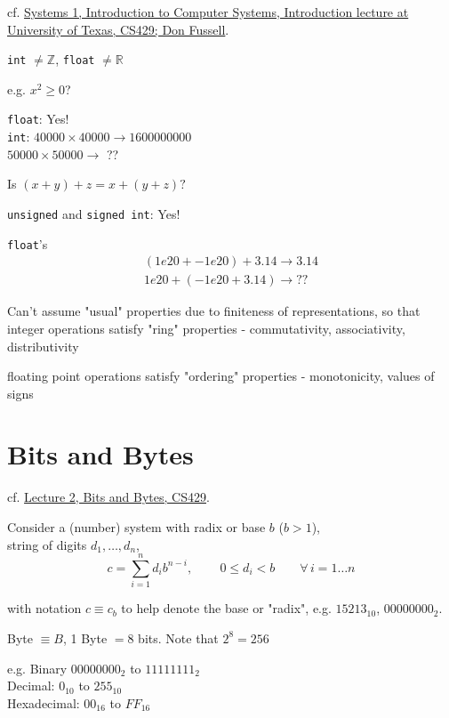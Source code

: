 \documentclass[10pt]{amsart}
\begin{document}
cf. \href{https://www.cs.utexas.edu/users/fussell/courses/cs429h/lectures/Lecture_1-429h.pdf}{Systems 1, Introduction to Computer Systems, Introduction lecture at University of Texas, CS429; Don Fussell}.

\texttt{int} $\neq \mathbb{Z}$, \texttt{float} $\neq \mathbb{R}$

e.g. $x^2 \geq 0$? 

\texttt{float}: Yes!  \\
\texttt{int}: $40000 \times 40000 \to 1600000000$ \\
\phantom{int} $50000 \times 50000 \to $ ??

Is $(x+y) + z = x + (y +z)?$

\texttt{unsigned} and \texttt{signed int}: Yes!

\texttt{float}'s 
\[
\begin{gathered}
(1e20 + -1e20) + 3.14 \to 3.14 \\
1e20 + (-1e20 + 3.14) \to ??
\end{gathered}
\]

Can't assume "usual" properties due to finiteness of representations, so that integer operations satisfy "ring" properties
- commutativity, associativity, distributivity

floating point operations satisfy "ordering" properties
- monotonicity, values of signs


\section{Bits and Bytes}

cf. \href{https://www.cs.utexas.edu/users/fussell/courses/cs429h/lectures/Lecture_2-429h.pdf}{Lecture 2, Bits and Bytes, CS429}.

Consider a (number) system with radix or base $b$ ($b>1$), \\
string of digits $d_1, \dots , d_n$, \\
\begin{equation}
c = \sum_{i=1}^n d_i b^{n-i}, \qquad \, 0 \leq d_i < b \qquad \forall \, i = 1 \dots n 
\end{equation}

with notation $c \equiv c_b$ to help denote the base or "radix", e.g. $15213_{10}$, $00000000_2$.

Byte $\equiv B$, 1 Byte $ = 8$ bits. Note that $2^8 = 256$

e.g. Binary $00000000_2$ to $11111111_2$ \\
Decimal: $0_{10}$ to $255_{10}$ \\
Hexadecimal: $00_{16}$ to $FF_{16}$
\end{document}
